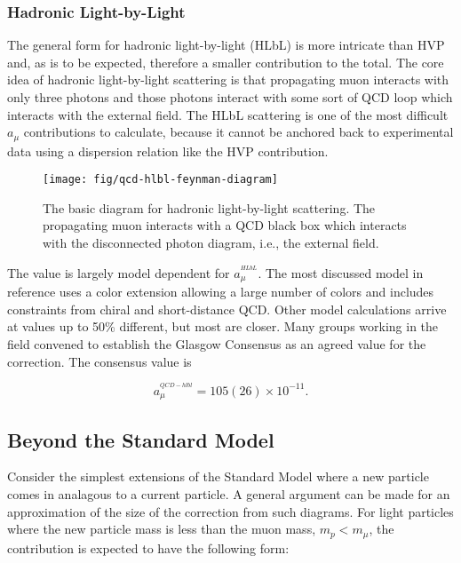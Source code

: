 \subsubsection{Hadronic Light-by-Light}

The general form for hadronic light-by-light (HLbL) is more intricate than HVP and, as is to be expected, therefore a smaller contribution to the total.  The core idea of hadronic light-by-light scattering is that propagating muon interacts with only three photons and those photons interact with some sort of QCD loop which interacts with the external field.  The HLbL scattering is one of the most difficult $a_\mu$ contributions to calculate, because it cannot be anchored back to experimental data using a dispersion relation like the HVP contribution\cite{the-muon-g-2}.

\begin{figure}
\label{fig:qcd-hlbl-feynman-diagram}
\centering
\texttt{[image: fig/qcd-hlbl-feynman-diagram]}
\caption{The basic diagram for hadronic light-by-light scattering.  The propagating muon interacts with a QCD black box which interacts with the disconnected photon diagram, i.e., the external field.}
\end{figure}

The value is largely model dependent for $a_\mu^{^{HLbL}}$.  The most discussed model in reference\cite{amm-of-muon} uses a color extension allowing a large number of colors and includes constraints from chiral and short-distance QCD.  Other model calculations arrive at values up to 50\% different, but most are closer.  Many groups working in the field convened to establish the Glasgow Consensus as an agreed value for the correction\cite{e989-tdr}.  The consensus value is

\begin{equation}
\label{eqn:qcd-hlbl-total}
a_\mu^{^{QCD-hlbl}} = 105(26) \times 10^{-11}.
\end{equation}

\subsection{Beyond the Standard Model}


Consider the simplest extensions of the Standard Model where a new particle comes in analagous to a current particle.  A general argument can be made for an approximation of the size of the correction from such diagrams\cite{the-muon-g-2}.  For light particles where the new particle mass is less than the muon mass, $m_p < m_\mu$, the contribution is expected to have the following form:

